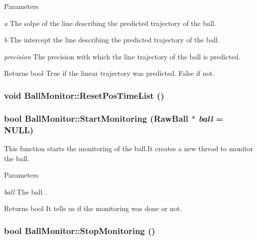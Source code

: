\begin{DoxyParams}{Parameters}
\item[{\em a}]The solpe of the line describing the predicted trajectory of the ball. \item[{\em b}]The intercept the line describing the predicted trajectory of the ball. \item[{\em precision}]The precision with which thr line trajectory of the ball is predicted. \end{DoxyParams}
\begin{DoxyReturn}{Returns}
bool True if the linear trajectory was predicted. False if not. 
\end{DoxyReturn}
\hypertarget{classBallMonitor_a09ed61cf1852d45f03e7aacdebfe0175}{
\subsubsection[{ResetPosTimeList}]{\setlength{\rightskip}{0pt plus 5cm}void BallMonitor::ResetPosTimeList ()}}
\label{classBallMonitor_a09ed61cf1852d45f03e7aacdebfe0175}
\hypertarget{classBallMonitor_a4d2b3aa764f5d4f4d5f58b7530565f90}{
\subsubsection[{StartMonitoring}]{\setlength{\rightskip}{0pt plus 5cm}bool BallMonitor::StartMonitoring (RawBall $\ast$ {\em ball} = {\ttfamily NULL})}}
\label{classBallMonitor_a4d2b3aa764f5d4f4d5f58b7530565f90}


This function starts the monitoring of the ball.It creates a new thread to monitor the ball. 


\begin{DoxyParams}{Parameters}
\item[{\em ball}]The ball . \end{DoxyParams}
\begin{DoxyReturn}{Returns}
bool It tells us if the monitoring was done or not. 
\end{DoxyReturn}
\hypertarget{classBallMonitor_af71db12abeb1f10f7be58eb7591910a3}{
\subsubsection[{StopMonitoring}]{\setlength{\rightskip}{0pt plus 5cm}bool BallMonitor::StopMonitoring ()}}
\label{classBallMonitor_af71db12abeb1f10f7be58eb7591910a3}


